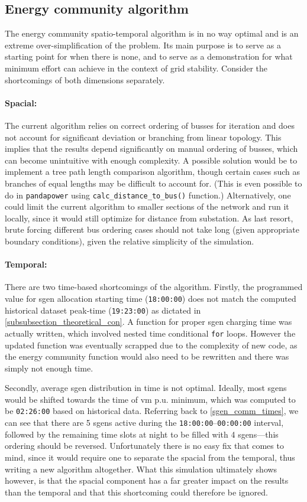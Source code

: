 \documentclass[a4paper,10pt]{report}
\begin{document}
\newpage
\subsection{Energy community algorithm}
The energy community spatio-temporal algorithm is in no way optimal and is an extreme over-simplification of the problem. Its main purpose is to serve as a starting point for when there is none, and to serve as a demonstration for what minimum effort can achieve in the context of grid stability. Consider the shortcomings of both dimensions separately.

\paragraph{Spacial:} The current algorithm relies on correct ordering of busses for iteration and does not account for significant deviation or branching from linear topology. This implies that the results depend significantly on manual ordering of busses, which can become unintuitive with enough complexity. A possible solution would be to implement a tree path length comparison algorithm, though certain cases such as branches of equal lengths may be difficult to account for. (This is even possible to do in \texttt{pandapower} using \texttt{calc\_distance\_to\_bus()} function.) Alternatively, one could limit the current algorithm to smaller sections of the network and run it locally, since it would still optimize for distance from substation. As last resort, brute forcing different bus ordering cases should not take long (given appropriate boundary conditions), given the relative simplicity of the simulation.

\paragraph{Temporal:} There are two time-based shortcomings of the algorithm. Firstly, the programmed value for sgen allocation starting time (\texttt{18:00:00}) does not match the computed historical dataset peak-time (\texttt{19:23:00}) as dictated in \cref{subsubsection_theoretical_con}. A function for proper sgen charging time was actually written, which involved nested time conditional \texttt{for} loops. However the updated function was eventually scrapped due to the complexity of new code, as the energy community function would also need to be rewritten and there was simply not enough time.

Secondly, average sgen distribution in time is not optimal. Ideally, most sgens would be shifted towards the time of vm p.u. minimum, which was computed to be \texttt{02:26:00} based on historical data. Referring back to \cref{sgen_comm_times}, we can see that there are 5 sgens active during the \texttt{18:00:00}--\texttt{00:00:00} interval, followed by the remaining time slots at night to be filled with 4 sgens---this ordering should be reversed. Unfortunately there is no easy fix that comes to mind, since it would require one to separate the spacial from the temporal, thus writing a new algorithm altogether. What this simulation ultimately shows however, is that the spacial component has a far greater impact on the results than the temporal and that this shortcoming could therefore be ignored.
\end{document}
